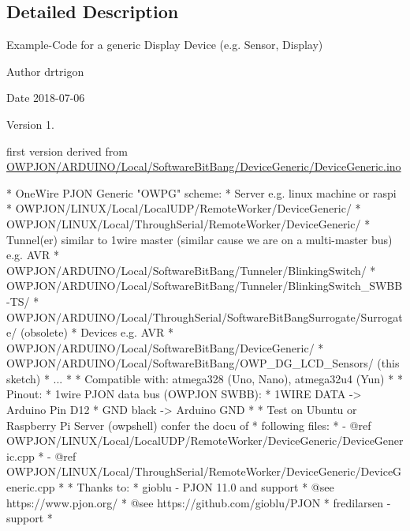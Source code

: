 \subsection{Detailed Description}
Example-\/\-Code for a generic Display Device (e.\-g. Sensor, Display) \begin{DoxyAuthor}{Author}
drtrigon 
\end{DoxyAuthor}
\begin{DoxyDate}{Date}
2018-\/07-\/06 
\end{DoxyDate}
\begin{DoxyVersion}{Version}
1. \begin{DoxyItemize}
\item first version derived from \hyperlink{ARDUINO_2Local_2SoftwareBitBang_2DeviceGeneric_2DeviceGeneric_8ino}{O\-W\-P\-J\-O\-N/\-A\-R\-D\-U\-I\-N\-O/\-Local/\-Software\-Bit\-Bang/\-Device\-Generic/\-Device\-Generic.\-ino}\end{DoxyItemize}
\begin{DoxyVerb}* OneWire PJON Generic "OWPG" scheme:
*   Server e.g. linux machine or raspi
*      OWPJON/LINUX/Local/LocalUDP/RemoteWorker/DeviceGeneric/
*      OWPJON/LINUX/Local/ThroughSerial/RemoteWorker/DeviceGeneric/
*   Tunnel(er) similar to 1wire master (similar cause we are on a multi-master bus) e.g. AVR
*      OWPJON/ARDUINO/Local/SoftwareBitBang/Tunneler/BlinkingSwitch/
*      OWPJON/ARDUINO/Local/SoftwareBitBang/Tunneler/BlinkingSwitch_SWBB-TS/
*      OWPJON/ARDUINO/Local/ThroughSerial/SoftwareBitBangSurrogate/Surrogate/ (obsolete)
*   Devices e.g. AVR
*      OWPJON/ARDUINO/Local/SoftwareBitBang/DeviceGeneric/
*      OWPJON/ARDUINO/Local/SoftwareBitBang/OWP_DG_LCD_Sensors/ (this sketch)
*      ...
*
* Compatible with: atmega328 (Uno, Nano), atmega32u4 (Yun)
*
* Pinout:
*   1wire PJON data bus (OWPJON SWBB):
*        1WIRE DATA    -> Arduino Pin D12
*        GND black     -> Arduino GND
*
* Test on Ubuntu or Raspberry Pi Server (owpshell) confer the docu of
* following files:
*   - @ref OWPJON/LINUX/Local/LocalUDP/RemoteWorker/DeviceGeneric/DeviceGeneric.cpp
*   - @ref OWPJON/LINUX/Local/ThroughSerial/RemoteWorker/DeviceGeneric/DeviceGeneric.cpp
*
* Thanks to:
* gioblu - PJON 11.0 and support
*          @see https://www.pjon.org/
*          @see https://github.com/gioblu/PJON
* fredilarsen - support
* \end{DoxyVerb}
 
\end{DoxyVersion}


